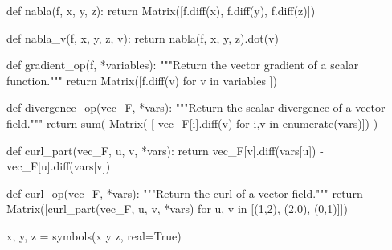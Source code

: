 \documentclass[
  a4paper,
  DIV=11,
  numbers=noendperiod]{scrreprt}
\newenvironment{Shaded}{\begin{snugshade}}{\end{snugshade}}
\newcommand{\BuiltInTok}[1]{\textcolor[rgb]{0.00,0.23,0.31}{#1}}
\newcommand{\CommentTok}[1]{\textcolor[rgb]{0.37,0.37,0.37}{#1}}
\newcommand{\ControlFlowTok}[1]{\textcolor[rgb]{0.00,0.23,0.31}{#1}}
\newcommand{\DecValTok}[1]{\textcolor[rgb]{0.68,0.00,0.00}{#1}}
\newcommand{\KeywordTok}[1]{\textcolor[rgb]{0.00,0.23,0.31}{#1}}
\newcommand{\NormalTok}[1]{\textcolor[rgb]{0.00,0.23,0.31}{#1}}
\newcommand{\OperatorTok}[1]{\textcolor[rgb]{0.37,0.37,0.37}{#1}}
\newcommand{\StringTok}[1]{\textcolor[rgb]{0.13,0.47,0.30}{#1}}
\newcommand{\VariableTok}[1]{\textcolor[rgb]{0.07,0.07,0.07}{#1}}
\begin{document}
\begin{Shaded}
\begin{Highlighting}[]
\KeywordTok{def}\NormalTok{ nabla(f, x, y, z):}
    \ControlFlowTok{return}\NormalTok{ Matrix([f.diff(x), f.diff(y), f.diff(z)])}

\KeywordTok{def}\NormalTok{ nabla\_v(f, x, y, z,  v):}
    \ControlFlowTok{return}\NormalTok{ nabla(f, x, y, z).dot(v)}

\KeywordTok{def}\NormalTok{ gradient\_op(f, }\OperatorTok{*}\NormalTok{variables):}
    \CommentTok{"""Return the vector gradient of a scalar function."""}
    \ControlFlowTok{return}\NormalTok{ Matrix([f.diff(v) }\ControlFlowTok{for}\NormalTok{ v }\KeywordTok{in}\NormalTok{ variables ])}

\KeywordTok{def}\NormalTok{ divergence\_op(vec\_F, }\OperatorTok{*}\BuiltInTok{vars}\NormalTok{):}
    \CommentTok{"""Return the scalar divergence of a vector field."""}
    \ControlFlowTok{return} \BuiltInTok{sum}\NormalTok{( Matrix( [ vec\_F[i].diff(v) }\ControlFlowTok{for}\NormalTok{ i,v }\KeywordTok{in} \BuiltInTok{enumerate}\NormalTok{(}\BuiltInTok{vars}\NormalTok{)]) )}

\KeywordTok{def}\NormalTok{ curl\_part(vec\_F, u, v, }\OperatorTok{*}\BuiltInTok{vars}\NormalTok{):}
    \ControlFlowTok{return}\NormalTok{ vec\_F[v].diff(}\BuiltInTok{vars}\NormalTok{[u]) }\OperatorTok{{-}}\NormalTok{ vec\_F[u].diff(}\BuiltInTok{vars}\NormalTok{[v])}
    
\KeywordTok{def}\NormalTok{ curl\_op(vec\_F, }\OperatorTok{*}\BuiltInTok{vars}\NormalTok{):}
    \CommentTok{"""Return the curl of a vector field."""}
    \ControlFlowTok{return}\NormalTok{ Matrix([curl\_part(vec\_F, u, v, }\OperatorTok{*}\BuiltInTok{vars}\NormalTok{) }\ControlFlowTok{for}\NormalTok{ u, v }\KeywordTok{in}\NormalTok{ [(}\DecValTok{1}\NormalTok{,}\DecValTok{2}\NormalTok{), (}\DecValTok{2}\NormalTok{,}\DecValTok{0}\NormalTok{), (}\DecValTok{0}\NormalTok{,}\DecValTok{1}\NormalTok{)]])}
\end{Highlighting}
\end{Shaded}

\begin{Shaded}
\begin{Highlighting}[]
\NormalTok{x, y, z }\OperatorTok{=}\NormalTok{ symbols(}\StringTok{\textquotesingle{}x y z\textquotesingle{}}\NormalTok{, real}\OperatorTok{=}\VariableTok{True}\NormalTok{)}
\end{Highlighting}
\end{Shaded}
\end{document}
